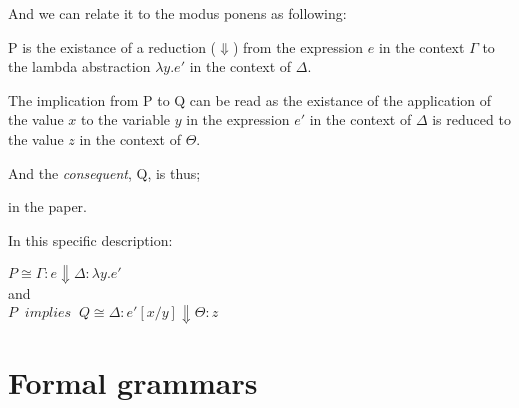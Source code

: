 And we can relate it to the modus ponens as following:

P is the existance of a reduction ($\Downarrow$) from the expression $e$ in the context $\Gamma$ to the 
lambda abstraction $\lambda y . e'$ in the context of $\Delta$.

The implication from P to Q can be read as the existance of the application of the value $x$ to the 
variable $y$ in the expression $e'$ in the context of $\Delta$ is reduced to the value $z$ in the context of
$\Theta$.

And the \emph{consequent}, Q, is thus;

in the paper. 

In this specific description: 
\begin{center}

$P \cong \Gamma : e \Downarrow \Delta : \lambda y . e'$ 
\\
and 
\\
$P \; \; implies \; \; Q \cong \Delta : e' [x/y] \Downarrow \Theta : z$ 

\end{center}



\section{Formal grammars}


